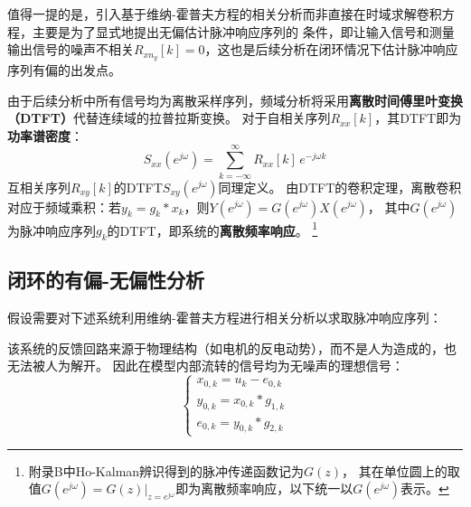 值得一提的是，引入基于维纳-霍普夫方程的相关分析而非直接在时域求解卷积方程，主要是为了显式地提出无偏估计脉冲响应序列的
条件，即让输入信号和测量输出信号的噪声不相关\(R_{xn_y}[k]=0\)，这也是后续分析在闭环情况下估计脉冲响应序列有偏的出发点。

由于后续分析中所有信号均为离散采样序列，频域分析将采用\textbf{离散时间傅里叶变换（DTFT）}代替连续域的拉普拉斯变换。
对于自相关序列\(R_{xx}[k]\)，其DTFT即为\textbf{功率谱密度}：
\begin{equation*}
    S_{xx}(e^{j\omega})=\sum_{k=-\infty}^{\infty}R_{xx}[k]\,e^{-j\omega k}
\end{equation*}
互相关序列\(R_{xy}[k]\)的DTFT\(S_{xy}(e^{j\omega})\)同理定义。
由DTFT的卷积定理，离散卷积对应于频域乘积：若\(y_k = g_k * x_k\)，则\(Y(e^{j\omega})=G(e^{j\omega})X(e^{j\omega})\)，
其中\(G(e^{j\omega})\)为脉冲响应序列\(g_k\)的DTFT，即系统的\textbf{离散频率响应}。
\footnote{附录B中Ho-Kalman辨识得到的脉冲传递函数记为\(G(z)\)，
其在单位圆上的取值\(G(e^{j\omega})=\left.G(z)\right|_{z=e^{j\omega}}\)即为离散频率响应，以下统一以\(G(e^{j\omega})\)表示。}

\subsection{闭环的有偏-无偏性分析}
假设需要对下述系统利用维纳-霍普夫方程进行相关分析以求取脉冲响应序列：
\begin{center}
\end{center}

该系统的反馈回路来源于物理结构（如电机的反电动势），而不是人为造成的，也无法被人为解开。
因此在模型内部流转的信号均为无噪声的理想信号：
\begin{equation*}
    \begin{cases}
    x_{0,k}=u_k-e_{0,k}\\
    y_{0,k}=x_{0,k}*g_{1,k}\\
    e_{0,k}=y_{0,k}*g_{2,k}
    \end{cases}
\end{equation*}

